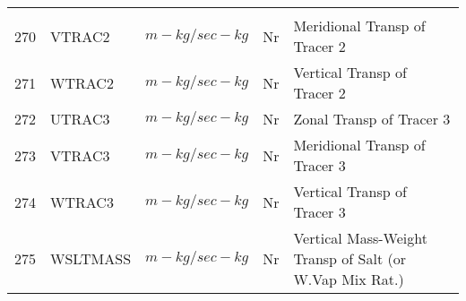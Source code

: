 \begin{tabular}{lllll}
\begin{minipage}[t]{3in}
         \end{minipage}\\
270& VTRAC2   & $m-kg/sec-kg$ & Nr
         &\begin{minipage}[t]{3in}
          {Meridional Transp of Tracer 2} 
         \end{minipage}\\
271& WTRAC2   & $m-kg/sec-kg$ & Nr
         &\begin{minipage}[t]{3in}
          {Vertical Transp of Tracer 2} 
         \end{minipage}\\
272& UTRAC3   & $m-kg/sec-kg$ & Nr
         &\begin{minipage}[t]{3in}
          {Zonal Transp of Tracer 3} 
         \end{minipage}\\
273& VTRAC3   & $m-kg/sec-kg$ & Nr
         &\begin{minipage}[t]{3in}
          {Meridional Transp of Tracer 3} 
         \end{minipage}\\
274& WTRAC3   & $m-kg/sec-kg$ & Nr
         &\begin{minipage}[t]{3in}
          {Vertical Transp of Tracer 3} 
         \end{minipage}\\
275& WSLTMASS & $m-kg/sec-kg$ & Nr
         &\begin{minipage}[t]{3in}
          {Vertical Mass-Weight Transp of Salt (or W.Vap Mix Rat.)} 
         \end{minipage}\\
\end{tabular}
\vspace{1.5in}
\vfill

